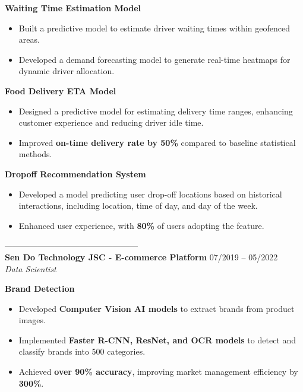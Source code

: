 \documentclass[10pt, letterpaper]{article}
\newenvironment{zitemize}{
\begin{itemize} \itemsep 0pt \parskip 0pt \parsep 1pt}
{\end{itemize}\vspace{-.5em}}
\begin{document}
\textbf{\small{Waiting Time Estimation Model}}
\begin{zitemize}
    \vspace{-1mm}\item \small{Built a predictive model to estimate driver waiting times within geofenced areas.}
    \item \small{Developed a demand forecasting model to generate real-time heatmaps for dynamic driver allocation.}
\end{zitemize}

\textbf{\small{Food Delivery ETA Model}}
\begin{zitemize}
    \vspace{-1mm}\item \small{Designed a predictive model for estimating delivery time ranges, enhancing customer experience and reducing driver idle time.}
    \item \small{Improved \textbf{on-time delivery rate by 50\%} compared to baseline statistical methods.}
\end{zitemize}

\textbf{\small{Dropoff Recommendation System}}
\begin{zitemize}
    \vspace{-1mm}\item \small{Developed a model predicting user drop-off locations based on historical interactions, including location, time of day, and day of the week.}
    \item \small{Enhanced user experience, with \textbf{80\%} of users adopting the feature.}
\end{zitemize}
------------------------------------------------ \\
\textbf{Sen Do Technology JSC - E-commerce Platform} \hfill 07/2019 – 05/2022 \\
\textit{Data Scientist} \\
\vspace{2mm}

\textbf{\small{Brand Detection}}
\begin{zitemize}
    \vspace{-1mm}\item \small{Developed \textbf{Computer Vision AI models} to extract brands from product images.}
    \item \small{Implemented \textbf{Faster R-CNN, ResNet, and OCR models} to detect and classify brands into 500 categories.}
    \item \small{Achieved \textbf{over 90\% accuracy}, improving market management efficiency by \textbf{300\%}.}
\end{zitemize}
\end{document}
